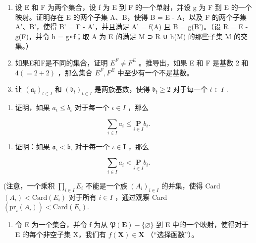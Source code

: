 \exercisegroup

\begin{enumerate}
\def\labelenumi{\arabic{enumi}.}
\item
  设 E 和 F 为两个集合，设 f 为 E 到 F 的一个单射，并设 g 为 F 到 E 的一个映射。证明存在 E 的两个子集 A、B，使得 B = E - A，以及 F 的两个子集 A'、B'，使得 B' = F - A'，并且满足 A' = f(A) 且 B = g(B')。（设 R = E - g(F)，并令 h = g∘f；取 A 为 E 的满足 M ⊃ R ∪ h(M) 的那些子集 M 的交集。）
\item
  如果E和F是不同的集合，证明 \(E^{F} \neq F^{E}\) 。推导出，如果 E 和 F 是基数 2 和 \(4(=2+2)\) ，那么集合 \(E^{F}, F^{E}\) 中至少有一个不是基数。
\item
  让 \((\mathfrak{a}_t)_{t\in I}\) 和 \((\mathfrak{b}_t)_{t\in I}\) 是两族基数，使得 \(\mathfrak{b}_t\geqslant 2\) 对于每一个 \(t\in I\) .
\end{enumerate}

\begin{enumerate}
\def\labelenumi{(\alph{enumi})}
\tightlist
\item
  证明，如果 \(a_{\iota} \leqslant b_{\iota}\) 对于每一个 \(\iota \in I\) ，那么
\end{enumerate}

\[
\sum_ {i \in I} a _ {i} \leqslant \underset {i \in I} {\mathbf {P}} b _ {i}.
\]

\begin{enumerate}
\def\labelenumi{(\alph{enumi})}
\setcounter{enumi}{1}
\tightlist
\item
  证明：如果 \(\mathfrak{a}_{\iota} < \mathfrak{b}_{\iota}\) 对于每一个 \(\iota \in \mathbf{I}\) ，那么
\end{enumerate}

\[
\sum_ {i \in I} a _ {i} <   \underset {i \in I} {\mathbf {P}} b _ {i}.
\]

(注意，一个乘积 \(\prod_{i\in I}E_i\) 不能是一个族 \((A_i)_{i\in I}\) 的并集，使得 Card \((A_i) < \text{Card}(E_i)\) 对于所有 \(i\in I\) ，通过观察 Card \((\text{pr}_i(A_i)) < \text{Card}(E_i).\)

\begin{enumerate}
\def\labelenumi{\arabic{enumi}.}
\setcounter{enumi}{3}
\tightlist
\item
  令 E 为一个集合，并令 f 为从 \(\mathfrak{P}(\mathbf{E}) - \{\varnothing\}\) 到 E 中的一个映射，使得对于 E 的每个非空子集 X，我们有 \(f(\mathbf{X}) \in \mathbf{X}\) （“选择函数”）。
\end{enumerate}

